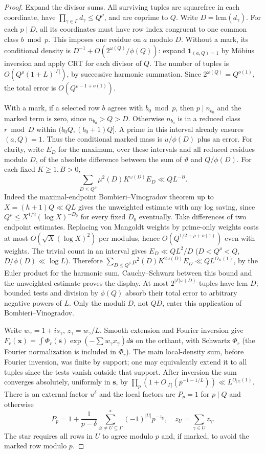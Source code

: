 \documentclass[11pt]{article}
\newcommand{\ind}{\mathbf 1}
\begin{document}
\begin{proof}
Expand the divisor sums. All surviving tuples are squarefree in each
coordinate, have $\prod_{\gamma\in\Gamma}d_\gamma\le Q^\rho$,
and are coprime to $Q$. Write $D=\mathrm{lcm}(d_\gamma)$.
For each $p\mid D$, all its coordinates must have row index congruent
to one common class $b\bmod p$. This imposes one residue on $a$ modulo
$D$. Without a mark, its conditional density is
$D^{-1}+O(2^{\omega(Q)}/\phi(Q))$: expand $\ind_{(a,Q)=1}$ by
M\"obius inversion and apply CRT for each divisor of $Q$. The number of
tuples is $O(Q^\rho(1+L)^{|\Gamma|})$, by successive harmonic summation.
Since $2^{\omega(Q)}=Q^{o(1)}$, the total error is $O(Q^{\rho-1+o(1)})$.

With a mark, if a selected row $b$ agrees with $b_0\bmod p$, then
$p\mid n_{b_0}$ and the marked term is zero, since $n_{b_0}>Q>D$.
Otherwise $n_{b_0}$ is in a reduced class $r\bmod D$ within
$(b_0Q,(b_0+1)Q]$. A prime in this interval already ensures $(a,Q)=1$.
Thus the conditional marked mass is $u/\phi(D)$ plus an error.
For clarity, write $E_D$ for the maximum, over these intervals and
all reduced residues modulo $D$, of the absolute difference between the
sum of $\vartheta$ and $Q/\phi(D)$. For each fixed $K\ge1,B>0$,
\[
 \sum_{D\le Q^\rho}\mu^2(D)K^{\omega(D)}E_D\ll QL^{-B}.
\]
Indeed the maximal-endpoint Bombieri--Vinogradov theorem up to
$X=(h+1)Q\ll QL$ gives the unweighted estimate with any log saving,
since $Q^\rho\le X^{1/2}(\log X)^{-D_0}$ for every fixed $D_0$ eventually.
Take differences of two endpoint estimates. Replacing von Mangoldt
weights by prime-only weights costs at most
$O(\sqrt X(\log X)^2)$ per modulus, hence $O(Q^{1/2+\rho+o(1)})$ even
with weights. The trivial count in an interval gives
$E_D\ll Q L^2/D$ ($D<Q^\rho<Q$, $D/\phi(D)\ll\log L$).
Therefore $\sum_{D\le Q^\rho}\mu^2(D)K^{2\omega(D)}E_D
\ll Q L^{O_K(1)}$, by the Euler product for the harmonic sum.
Cauchy--Schwarz between this bound and the unweighted estimate proves
the display. At most $2^{|\Gamma|\omega(D)}$ tuples have lcm $D$;
bounded tests and division by $\phi(Q)$ absorb their total error to
arbitrary negative powers of $L$. Only the moduli $D$, not $QD$,
enter this application of Bombieri--Vinogradov.

Write $w_\gamma=1+is_\gamma$, $z_\gamma=w_\gamma/L$. Smooth extension
and Fourier inversion give
$F_r(\mathbf x)=\int\Phi_r(\mathbf s)\exp(-\sum w_\gamma x_\gamma)d\mathbf s$
on the orthant, with Schwartz $\Phi_r$ (the Fourier normalization
is included in $\Phi_r$). The main local-density sum, before Fourier
inversion, was finite by support; one may equivalently extend it to
all tuples since the tests vanish outside that support.
After inversion the sum converges absolutely, uniformly in $\mathbf s$,
by $\prod_p(1+O_{|\Gamma|}(p^{-1-1/L}))\ll L^{O_{|\Gamma|}(1)}$.
There is an external factor $u^\delta$ and the local factors are
$P_p=1$ for $p\mid Q$ and otherwise
\[
 P_p=1+\frac1{p-\delta}
 \sum_{\varnothing\ne U\subseteq\Gamma}^{*}
 (-1)^{|U|}p^{-z_U},\quad z_U=\sum_{\gamma\in U}z_\gamma.
\]
The star requires all rows in $U$ to agree modulo $p$ and, if marked,
to avoid the marked row modulo $p$.


\end{proof}
\end{document}
